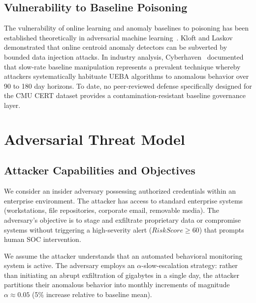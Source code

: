 \documentclass[conference]{IEEEtran}
\begin{document}
\subsection{Vulnerability to Baseline Poisoning}
The vulnerability of online learning and anomaly baselines to poisoning has been established theoretically in adversarial machine learning~\cite{kloft2012security, biggio2018wild}. Kloft and Laskov demonstrated that online centroid anomaly detectors can be subverted by bounded data injection attacks. In industry analysis, Cyberhaven~\cite{cyberhaven2024anomaly} documented that slow-rate baseline manipulation represents a prevalent technique whereby attackers systematically habituate UEBA algorithms to anomalous behavior over 90 to 180 day horizons. To date, no peer-reviewed defense specifically designed for the CMU CERT dataset provides a contamination-resistant baseline governance layer.

\section{Adversarial Threat Model}
\label{sec:threat_model}

\subsection{Attacker Capabilities and Objectives}
We consider an insider adversary possessing authorized credentials within an enterprise environment. The attacker has access to standard enterprise systems (workstations, file repositories, corporate email, removable media). The adversary's objective is to stage and exfiltrate proprietary data or compromise systems without triggering a high-severity alert ($RiskScore \ge 60$) that prompts human SOC intervention.

We assume the attacker understands that an automated behavioral monitoring system is active. The adversary employs an $\alpha$-slow-escalation strategy: rather than initiating an abrupt exfiltration of gigabytes in a single day, the attacker partitions their anomalous behavior into monthly increments of magnitude $\alpha \approx 0.05$ (5\% increase relative to baseline mean).
\end{document}
